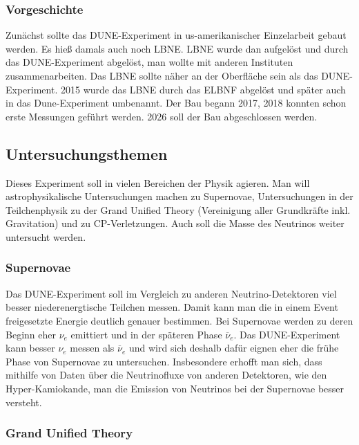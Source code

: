 \subsubsection{Vorgeschichte}

Zunächst sollte das DUNE-Experiment in us-amerikanischer Einzelarbeit gebaut werden. Es hieß damals auch noch LBNE. \cite{Moore2015}
LBNE wurde dan aufgelöst und durch das DUNE-Experiment abgelöst, man wollte mit anderen Instituten zusammenarbeiten. 
Das LBNE sollte näher an der Oberfläche sein als das DUNE-Experiment. 2015 wurde das LBNE durch das ELBNF abgelöst und später auch
in das Dune-Experiment umbenannt. Der Bau begann 2017, 2018 konnten schon erste Messungen geführt werden. 2026 soll der Bau abgeschlossen
werden. \cite{Fermilab2015}

\subsection{Untersuchungsthemen}

Dieses Experiment soll in vielen Bereichen der Physik agieren. Man will astrophysikalische Untersuchungen machen zu Supernovae,
Untersuchungen in der Teilchenphysik zu der Grand Unified Theory (Vereinigung aller Grundkräfte inkl. Gravitation) und 
zu CP-Verletzungen. Auch soll die Masse des Neutrinos weiter untersucht werden. \cite{Brailsford2018}

\subsubsection{Supernovae}

Das DUNE-Experiment soll im Vergleich zu anderen Neutrino-Detektoren viel besser niederenergtische Teilchen messen. Damit
kann man die in einem Event freigesetzte Energie deutlich genauer bestimmen. Bei Supernovae werden zu deren Beginn eher $\nu_e$
emittiert und in der späteren Phase $\overline{\nu}_e$. Das DUNE-Experiment kann besser $\nu_e$ messen als $\overline{\nu}_e$ und
wird sich deshalb dafür eignen eher die frühe Phase von Supernovae zu untersuchen. Insbesondere erhofft man sich, dass mithilfe
von Daten über die Neutrinofluxe von anderen Detektoren, wie den Hyper-Kamiokande, man die Emission von Neutrinos bei der Supernovae
besser versteht. \cite{Ankowsi2016}

\subsubsection{Grand Unified Theory}

